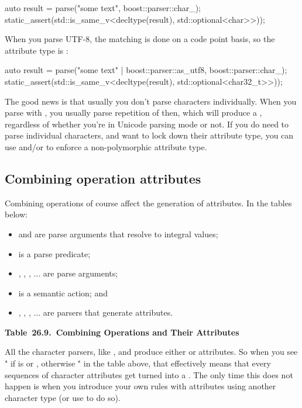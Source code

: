 \documentclass{MyBook}
\begin{document}
\begin{code}
auto result = parse("some text", boost::parser::char_);
static_assert(std::is_same_v<decltype(result), std::optional<char>>));
\end{code}

When you parse UTF-8, the matching is done on a code point basis, so the attribute type is :

\begin{code}
auto result = parse("some text" | boost::parser::as_utf8, boost::parser::char_);
static_assert(std::is_same_v<decltype(result), std::optional<char32_t>>));
\end{code}

The good news is that usually you don't parse characters individually. When you parse with , you usually parse repetition of then, which will produce a , regardless of whether you're in Unicode parsing mode or not. If you do need to parse individual characters, and want to lock down their attribute type, you can use  and/or  to enforce a non-polymorphic attribute type.

\subsection{Combining operation attributes}

Combining operations of course affect the generation of attributes. In the tables below:

\begin{itemize}
\item
   and  are parse arguments that resolve to integral values;
\item
   is a parse predicate;
\item
  , , , ... are parse arguments;
\item
   is a semantic action; and
\item
  , , , ... are parsers that generate attributes.
\end{itemize}

\textbf{Table~26.9.~Combining Operations and Their Attributes}



\hfill\break

\begin{marker}[title=Important ]
All the character parsers, like ,  and  produce either  or  attributes. So when you see " if \emph{} is  or , otherwise \emph{}" in the table above, that effectively means that every sequences of character attributes get turned into a . The only time this does not happen is when you introduce your own rules with attributes using another character type (or use  to do so). 
\end{marker}
\end{document}
